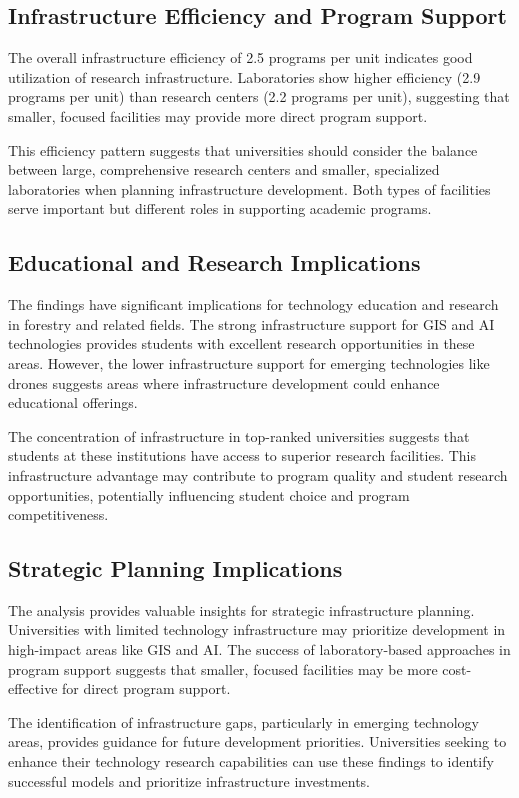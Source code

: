 \documentclass[12pt]{article}
\begin{document}
\subsection{Infrastructure Efficiency and Program Support}
The overall infrastructure efficiency of 2.5 programs per unit indicates good utilization of research infrastructure. Laboratories show higher efficiency (2.9 programs per unit) than research centers (2.2 programs per unit), suggesting that smaller, focused facilities may provide more direct program support.

This efficiency pattern suggests that universities should consider the balance between large, comprehensive research centers and smaller, specialized laboratories when planning infrastructure development. Both types of facilities serve important but different roles in supporting academic programs.

\subsection{Educational and Research Implications}
The findings have significant implications for technology education and research in forestry and related fields. The strong infrastructure support for GIS and AI technologies provides students with excellent research opportunities in these areas. However, the lower infrastructure support for emerging technologies like drones suggests areas where infrastructure development could enhance educational offerings.

The concentration of infrastructure in top-ranked universities suggests that students at these institutions have access to superior research facilities. This infrastructure advantage may contribute to program quality and student research opportunities, potentially influencing student choice and program competitiveness.

\subsection{Strategic Planning Implications}
The analysis provides valuable insights for strategic infrastructure planning. Universities with limited technology infrastructure may prioritize development in high-impact areas like GIS and AI. The success of laboratory-based approaches in program support suggests that smaller, focused facilities may be more cost-effective for direct program support.

The identification of infrastructure gaps, particularly in emerging technology areas, provides guidance for future development priorities. Universities seeking to enhance their technology research capabilities can use these findings to identify successful models and prioritize infrastructure investments.
\end{document}
